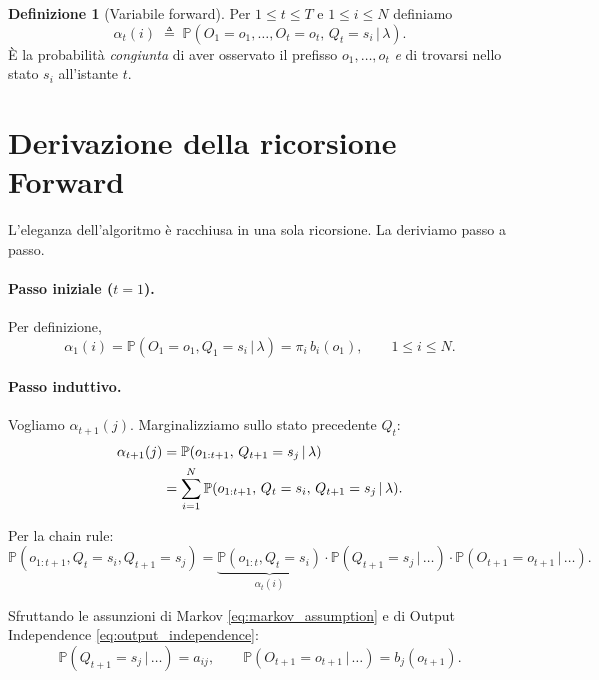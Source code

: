 \documentclass[11pt,a4paper,oneside]{book}
\theoremstyle{plain}
\theoremstyle{definition}
\newtheorem{definizione}[teorema]{Definizione}
\theoremstyle{remark}
\newcommand{\Prob}{\mathbb{P}}
\newcommand{\hmm}{\lambda}                   %
\newcommand{\Nstates}{N}                     %
\newcommand{\Tlen}{T}                        %
\newcommand{\fwd}{\alpha}                    %
\newcommand{\given}{\,\vert\,}
\begin{document}
\begin{definizione}[Variabile forward]
\label{def:forward}
Per $1\le t\le \Tlen$ e $1\le i\le \Nstates$ definiamo
\begin{equation}
    \fwd_t(i) \;\triangleq\; \Prob(O_1=o_1,\dots,O_t=o_t,\, Q_t=s_i \given \hmm).
    \label{eq:fwd_def}
\end{equation}
È la probabilità \emph{congiunta} di aver osservato il prefisso
$o_1,\dots,o_t$ \emph{e} di trovarsi nello stato $s_i$ all'istante $t$.
\end{definizione}

\section{Derivazione della ricorsione Forward}

L'eleganza dell'algoritmo è racchiusa in una sola ricorsione. La
deriviamo passo a passo.

\paragraph{Passo iniziale ($t=1$).} Per definizione,
\begin{equation}
    \fwd_1(i) = \Prob(O_1=o_1, Q_1=s_i\given\hmm)
    = \pi_i\, b_i(o_1), \qquad 1\le i \le \Nstates.
    \label{eq:fwd_init}
\end{equation}

\paragraph{Passo induttivo.} Vogliamo $\fwd_{t+1}(j)$. Marginalizziamo
sullo stato precedente $Q_t$:
\begin{align}
\fwd_{t+1}(j)
&= \Prob(o_{1:t+1},\,Q_{t+1}=s_j\given\hmm) \notag\\
&= \sum_{i=1}^{\Nstates} \Prob(o_{1:t+1},\,Q_t=s_i,\,Q_{t+1}=s_j\given\hmm).
\end{align}

Per la chain rule:
\begin{equation}
\Prob(o_{1:t+1},Q_t=s_i,Q_{t+1}=s_j)
= \underbrace{\Prob(o_{1:t},Q_t=s_i)}_{\fwd_t(i)}
  \cdot\Prob(Q_{t+1}=s_j\given\dots)
  \cdot\Prob(O_{t+1}=o_{t+1}\given\dots).
\end{equation}

Sfruttando le assunzioni di Markov \eqref{eq:markov_assumption} e di
Output Independence \eqref{eq:output_independence}:
\[
\Prob(Q_{t+1}=s_j\given\dots) = a_{ij},\qquad
\Prob(O_{t+1}=o_{t+1}\given\dots) = b_j(o_{t+1}).
\]
\end{document}
